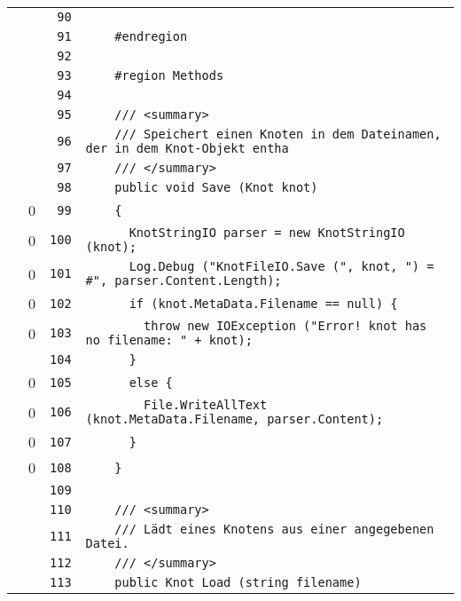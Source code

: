 \documentclass[a4paper,10pt]{article}
\begin{document}
\begin{longtable}[l]{lrrl}
\cellcolor{gray} &  & \verb~90~ & \verb~~\\
\cellcolor{gray} &  & \verb~91~ & \verb~    #endregion~\\
\cellcolor{gray} &  & \verb~92~ & \verb~~\\
\cellcolor{gray} &  & \verb~93~ & \verb~    #region Methods~\\
\cellcolor{gray} &  & \verb~94~ & \verb~~\\
\cellcolor{gray} &  & \verb~95~ & \verb~    /// <summary>~\\
\cellcolor{gray} &  & \verb~96~ & \verb~    /// Speichert einen Knoten in dem Dateinamen, der in dem Knot-Objekt entha~\\
\cellcolor{gray} &  & \verb~97~ & \verb~    /// </summary>~\\
\cellcolor{gray} &  & \verb~98~ & \verb~    public void Save (Knot knot)~\\
\cellcolor{red} & 0 & \verb~99~ & \verb~    {~\\
\cellcolor{red} & 0 & \verb~100~ & \verb~      KnotStringIO parser = new KnotStringIO (knot);~\\
\cellcolor{red} & 0 & \verb~101~ & \verb~      Log.Debug ("KnotFileIO.Save (", knot, ") = #", parser.Content.Length);~\\
\cellcolor{red} & 0 & \verb~102~ & \verb~      if (knot.MetaData.Filename == null) {~\\
\cellcolor{red} & 0 & \verb~103~ & \verb~        throw new IOException ("Error! knot has no filename: " + knot);~\\
\cellcolor{gray} &  & \verb~104~ & \verb~      }~\\
\cellcolor{red} & 0 & \verb~105~ & \verb~      else {~\\
\cellcolor{red} & 0 & \verb~106~ & \verb~        File.WriteAllText (knot.MetaData.Filename, parser.Content);~\\
\cellcolor{red} & 0 & \verb~107~ & \verb~      }~\\
\cellcolor{red} & 0 & \verb~108~ & \verb~    }~\\
\cellcolor{gray} &  & \verb~109~ & \verb~~\\
\cellcolor{gray} &  & \verb~110~ & \verb~    /// <summary>~\\
\cellcolor{gray} &  & \verb~111~ & \verb~    /// Lädt eines Knotens aus einer angegebenen Datei.~\\
\cellcolor{gray} &  & \verb~112~ & \verb~    /// </summary>~\\
\cellcolor{gray} &  & \verb~113~ & \verb~    public Knot Load (string filename)~\\

\end{longtable}
\end{document}
